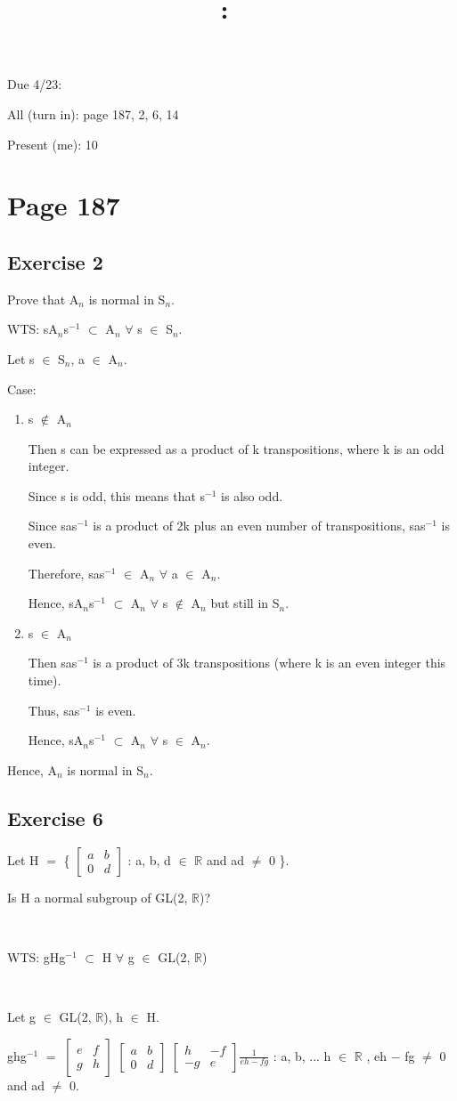 \documentclass{article}
\title{
    \vspace{2in}
    \textmd{\textbf{\hmwkClass:\ \hmwkTitle}}\\
    \normalsize\vspace{0.1in}\small\vspace{0.1in}\large{\textit{\hmwkClassInstructor}}
    \vspace{3in}
}
\author{\hmwkAuthorName}
\date{}
\newcommand{\mt}[1]{\ensuremath{#1}}
\newcommand\bsc[2][\DefaultOpt]{%
  \def\DefaultOpt{#2}%
  \section[#1]{#2}%
}
\newcommand\ssc[2][\DefaultOpt]{%
  \def\DefaultOpt{#2}%
  \subsection[#1]{#2}%
}
\newcommand{\elist}{\end{enumerate}}
\newcommand{\bilist}{\begin{enumerate}[label=\roman*)]}
\newcommand{\br}{\mt{\mathbb{R}} }       %
\newcommand{\fa}{\mt{\forall} }          %
\newcommand{\mem}{\mt{\in} }
\newcommand{\sbs}{\mt{\subset} }         %
\newcommand{\bk}[1]{\{#1\}}
\newcommand{\ms}{\mt{-} }
\newcommand{\eql}{\mt{=} }
\newcommand{\uw}[2]{#1\mt{_{#2}}}
\newcommand{\uf}[2]{#1\mt{^{#2}}}
\begin{document}
Due 4/23:

All (turn in): page 187, 2, 6, 14

Present (me): 10

\bsc{Page 187}{

\ssc{Exercise 2}{

Prove that \uw{A}{n} is normal in \uw{S}{n}.

WTS: s\uw{A}{n}\uf{s}{-1} \sbs \uw{A}{n} \fa s \mem \uw{S}{n}.

Let s \mem \uw{S}{n}, a \mem \uw{A}{n}.

Case: 
\bilist
\item s $\notin$ \uw{A}{n}

Then s can be expressed as a product of k transpositions, where k is an odd integer.

Since s is odd, this means that \uf{s}{-1} is also odd.

Since sa\uf{s}{-1} is a product of 2k plus an even number of transpositions, sa\uf{s}{-1} is even.

Therefore, sa\uf{s}{-1} \mem \uw{A}{n} \fa a \mem \uw{A}{n}.

Hence, s\uw{A}{n}\uf{s}{-1} \sbs \uw{A}{n} \fa s $\notin$ \uw{A}{n} but still in \uw{S}{n}.

\item s \mem \uw{A}{n}

Then sa\uf{s}{-1} is a product of 3k transpositions (where k is an even integer this time).

Thus, sa\uf{s}{-1} is even.

Hence, s\uw{A}{n}\uf{s}{-1} \sbs \uw{A}{n} \fa s \mem \uw{A}{n}.

\elist

Hence, \uw{A}{n} is normal in \uw{S}{n}.



}

\ssc{Exercise 6}{

Let H \eql \bk{
$\begin{bmatrix}{}
  a & b \\
  0 & d
\end{bmatrix}$ : a, b, d \mem \br and ad $\neq$ 0
}.

Is H a normal subgroup of GL(2, $\br$)?

\

WTS: gH\uf{g}{-1} \sbs H \fa g \mem GL(2, $\br$)

\

Let g \mem GL(2, $\br$), h \mem H.

gh\uf{g}{-1} \eql 
$\begin{bmatrix}{}
  e & f \\
  g & h
\end{bmatrix}$
$\begin{bmatrix}{}
  a & b \\
  0 & d
\end{bmatrix}$
$\begin{bmatrix}{}
  h & -f \\
  -g & e
\end{bmatrix}\frac{1}{eh - fg}$ : a, b, ... h \mem \br, eh \ms fg $\neq$ 0 and ad $\neq$ 0.

}}
\end{document}

